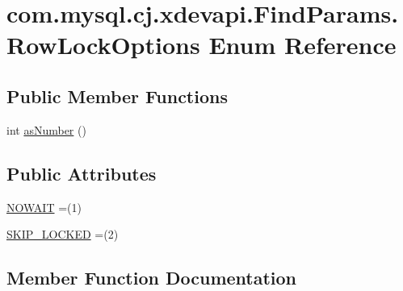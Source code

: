 \hypertarget{enumcom_1_1mysql_1_1cj_1_1xdevapi_1_1_find_params_1_1_row_lock_options}{}\section{com.\+mysql.\+cj.\+xdevapi.\+Find\+Params.\+Row\+Lock\+Options Enum Reference}
\label{enumcom_1_1mysql_1_1cj_1_1xdevapi_1_1_find_params_1_1_row_lock_options}
\subsection*{Public Member Functions}
\begin{DoxyCompactItemize}
\item 
int \mbox{\hyperlink{enumcom_1_1mysql_1_1cj_1_1xdevapi_1_1_find_params_1_1_row_lock_options_a6fc3474051ae4def5ad719541a78d519}{as\+Number}} ()
\end{DoxyCompactItemize}
\subsection*{Public Attributes}
\begin{DoxyCompactItemize}
\item 
\mbox{\hyperlink{enumcom_1_1mysql_1_1cj_1_1xdevapi_1_1_find_params_1_1_row_lock_options_a2652b9f0cf6fc16491dd4539320f7333}{N\+O\+W\+A\+IT}} =(1)
\item 
\mbox{\hyperlink{enumcom_1_1mysql_1_1cj_1_1xdevapi_1_1_find_params_1_1_row_lock_options_ae0b500686e79e2bd8cfa2b94e2bf557e}{S\+K\+I\+P\+\_\+\+L\+O\+C\+K\+ED}} =(2)
\end{DoxyCompactItemize}


\subsection{Member Function Documentation}
\mbox{\label{enumcom_1_1mysql_1_1cj_1_1xdevapi_1_1_find_params_1_1_row_lock_options_a6fc3474051ae4def5ad719541a78d519}} 

